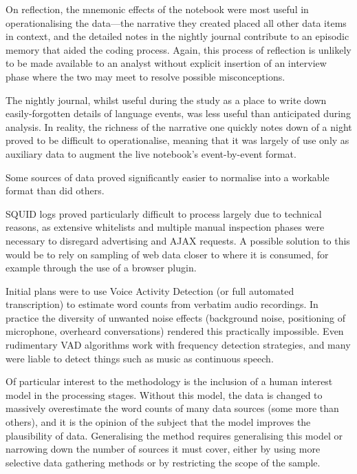 On reflection, the mnemonic effects of the notebook were most useful in operationalising the data---the narrative they created placed all other data items in context, and the detailed notes in the nightly journal contribute to an episodic memory that aided the coding process.  Again, this process of reflection is unlikely to be made available to an analyst without explicit insertion of an interview phase where the two may meet to resolve possible misconceptions.

The nightly journal, whilst useful during the study as a place to write down easily-forgotten details of language events, was less useful than anticipated during analysis.  In reality, the richness of the narrative one quickly notes down of a night proved to be difficult to operationalise, meaning that it was largely of use only as auxiliary data to augment the live notebook's event-by-event format.

Some sources of data proved significantly easier to normalise into a workable format than did others.

SQUID logs proved particularly difficult to process largely due to technical reasons, as extensive whitelists and multiple manual inspection phases were necessary to disregard advertising and AJAX requests.  A possible solution to this would be to rely on sampling of web data closer to where it is consumed, for example through the use of a browser plugin.

Initial plans were to use Voice Activity Detection (or full automated transcription) to estimate word counts from verbatim audio recordings.  In practice the diversity of unwanted noise effects (background noise, positioning of microphone, overheard conversations) rendered this practically impossible.  Even rudimentary VAD algorithms work with frequency detection strategies, and many were liable to detect things such as music as continuous speech.  %



Of particular interest to the methodology is the inclusion of a human interest model in the processing stages.  Without this model, the data is changed to massively overestimate the word counts of many data sources (some more than others), and it is the opinion of the subject that the model improves the plausibility of data.  Generalising the method requires generalising this model or narrowing down the number of sources it must cover, either by using more selective data gathering methods or by restricting the scope of the sample.

